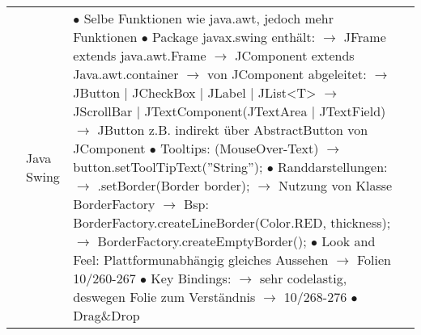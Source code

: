 \documentclass[11pt,a4paper]{article}
\begin{document}
\begin{center}
\begin{longtable}[h]{ | p{2.3cm} | p{2.3cm} | p{12.6cm} | p{1.2cm} | }
	& Java Swing & \makecell[l]{ $\bullet$ Selbe Funktionen wie java.awt, jedoch mehr Funktionen \\
	$\bullet$ Package javax.swing enthält: \\
	\hspace{0.4cm} $\rightarrow$ JFrame extends java.awt.Frame \\
	\hspace{0.4cm} $\rightarrow$ JComponent extends Java.awt.container \\
	\hspace{0.4cm} $\rightarrow$ von JComponent abgeleitet: \\
	\hspace{0.8cm} $\rightarrow$ JButton | JCheckBox | JLabel | JList<T> \\
	\hspace{0.8cm} $\rightarrow$ JScrollBar | JTextComponent(JTextArea | JTextField) \\
	\hspace{0.8cm} $\rightarrow$ JButton z.B. indirekt über AbstractButton von JComponent \\
	$\bullet$ Tooltips: (MouseOver-Text) \\
	\hspace{0.4cm} $\rightarrow$ button.setToolTipText(''String'');
	$\bullet$ Randdarstellungen: \\
	\hspace{0.4cm} $\rightarrow$ .setBorder(Border border);
	\hspace{0.4cm} $\rightarrow$ Nutzung von Klasse BorderFactory \\
	\hspace{0.4cm} $\rightarrow$ Bsp: BorderFactory.createLineBorder(Color.RED, thickness); \\
	\hspace{0.4cm} $\rightarrow$ BorderFactory.createEmptyBorder(); \\
	$\bullet$ Look and Feel: Plattformunabhängig gleiches Aussehen \\
	\hspace{0.4cm} $\rightarrow$ Folien 10/260-267 \\
	$\bullet$ Key Bindings: \\
	\hspace{0.4cm} $\rightarrow$ sehr codelastig, deswegen Folie zum Verständnis \\
	\hspace{0.4cm} $\rightarrow$ 10/268-276   \\
	$\bullet$ Drag\&Drop\\
}
\end{longtable}
\end{center}
\end{document}
